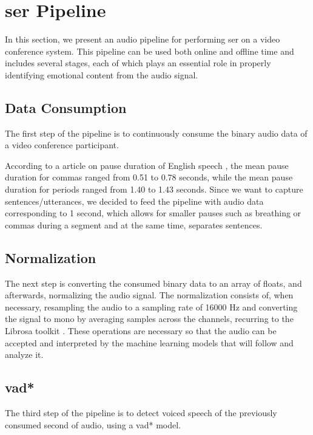 \chapter{\acl{ser} Pipeline}
\label{chapter:ser_conf}

In this section, we present an audio pipeline for performing \ac{ser} on a video conference system. This pipeline can be used both online and offline time and includes several stages, each of which plays an essential role in properly identifying emotional content from the audio signal.

\section{Data Consumption}

The first step of the pipeline is to continuously consume the binary audio data of a video conference participant.

According to a \citeyear{Liu2022} article on pause duration of English speech \cite{Liu2022}, the mean pause duration for commas ranged from 0.51 to 0.78 seconds, while the mean pause duration for periods ranged from 1.40 to 1.43 seconds. Since we want to capture sentences/utterances, we decided to feed the pipeline with audio data corresponding to 1 second, which allows for smaller pauses such as breathing or commas during a segment and at the same time, separates sentences.

\section{Normalization}

The next step is converting the consumed binary data to an array of floats, and afterwards, normalizing the audio signal. The normalization consists of, when necessary, resampling the audio to a sampling rate of 16000 Hz and converting the signal to mono by averaging samples across the channels, recurring to the Librosa toolkit \cite{Librosa}. These operations are necessary so that the audio can be accepted and interpreted by the machine learning models that will follow and analyze it.

\section{\acl{vad*}}

The third step of the pipeline is to detect voiced speech of the previously consumed second of audio, using a \ac{vad*} model.

